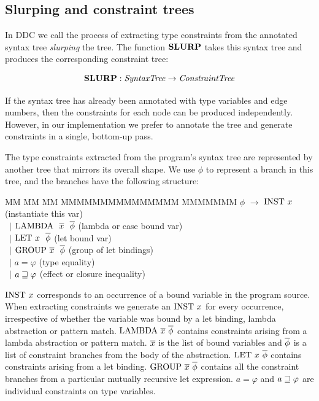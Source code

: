 \clearpage{}
\subsection{Slurping and constraint trees}
\label{Inference:Language:slurping}
In DDC we call the process of extracting type constraints from the annotated syntax tree \emph{slurping} the tree. The function $\textrm{\textbf{SLURP}}$ takes this syntax tree and produces the corresponding constraint tree:

$$
\textrm{\textbf{SLURP}} : \operatorname{\mathit{SyntaxTree}} \to \operatorname{\mathit{ConstraintTree}}
$$

If the syntax tree has already been annotated with type variables and edge numbers, then the constraints for each node can be produced independently. However, in our implementation we prefer to annotate the tree and generate constraints in a single, bottom-up pass. 

The type constraints extracted from the program's syntax tree are represented by another tree that mirrors its overall shape. We use $\phi$ to represent a branch in this tree, and the branches have the following structure:

\vspace{-1ex}
\begin{tabbing}
MM	\= MM 	\= MM \= MMMMMMMMMMMMMMM \= MMMMMMM \kill
	\> $\phi$ 	\> $\to$ 	\> $\textrm{INST} \ x$			
		\> (instantiate this var)		
		\\
\>	\> \ $\mid$	\> $\trm{LAMBDA} \ \ \ov{x} \ \	\ov{\phi}$	
		\> (lambda or case bound var) 		
		\\
\>	\> \ $\mid$	\> $\textrm{LET} \ x \ \ 		\overline{\phi}$	
		\> (let bound var) 			
		\\
\>	\> \ $\mid$	\> $\textrm{GROUP} \ \overline{x} \ \ 	\overline{\phi}$	
		\> (group of let bindings) 		
		\\
\>	\> \ $\mid$	\> $a = \varphi$
		\> (type equality)			
		\\
\>	\> \ $\mid$	\> $a \sqsupseteq \varphi$
		\> (effect or closure inequality)
\end{tabbing}

$\textrm{INST} \ x$ corresponds to an occurrence of a bound variable in the program source. When extracting constraints we generate an $\textrm{INST} \ x$ for every occurrence, irrespective of whether the variable was bound by a let binding, lambda abstraction or pattern match. $\textrm{LAMBDA} \ \overline{x} \ \overline{\phi}$ contains constraints arising from a lambda abstraction or pattern match. $\overline{x}$ is the list of bound variables and $\overline{\phi}$ is a list of constraint branches from the body of the abstraction. $\textrm{LET} \ x \ \overline{\phi}$ contains constraints arising from a let binding. $\textrm{GROUP} \ \overline{x} \ \overline{\phi}$ contains all the constraint branches from a particular mutually recursive let expression. $a = \varphi$ and $a \sqsupseteq \varphi$ are individual constraints on type variables.

